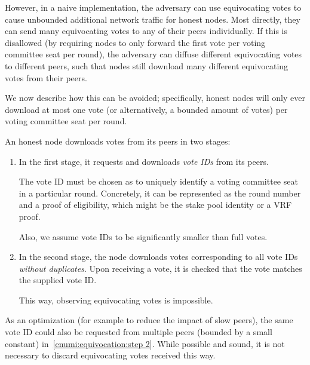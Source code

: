 However, in a naive implementation, the adversary can use equivocating votes to cause unbounded additional network traffic for honest nodes.
Most directly, they can send many equivocating votes to any of their peers individually.
If this is disallowed (by requiring nodes to only forward the first vote per voting committee seat per round), the adversary can diffuse different equivocating votes to different peers, such that nodes still download many different equivocating votes from their peers.

We now describe how this can be avoided; specifically, honest nodes will only ever download at most one vote (or alternatively, a bounded amount of votes) per voting committee seat per round.

An honest node downloads votes from its peers in two stages:
\begin{enumerate}
\item\label{enumi:equivocation:step 1}
  In the first stage, it requests and downloads \emph{vote IDs} from its peers.

  The vote ID must be chosen as to uniquely identify a voting committee seat in a particular round.
  Concretely, it can be represented as the round number and a proof of eligibility, which might be the stake pool identity or a VRF proof.

  Also, we assume vote IDs to be significantly smaller than full votes.
\item\label{enumi:equivocation:step 2}
  In the second stage, the node downloads votes corresponding to all vote IDs \emph{without duplicates}.
  Upon receiving a vote, it is checked that the vote matches the supplied vote ID.\@

  This way, observing equivocating votes is impossible.
\end{enumerate}
As an optimization (for example to reduce the impact of slow peers), the same vote ID could also be requested from multiple peers (bounded by a small constant) in~\ref{enumi:equivocation:step 2}.
While possible and sound, it is not necessary to discard equivocating votes received this way.

